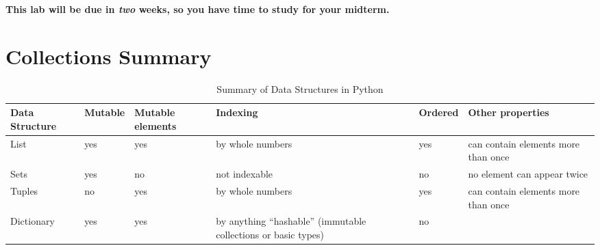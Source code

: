 \documentclass[11pt]{cselabheader}
\begin{document}
\textbf{This lab will be due in \emph{two} weeks, so you have time to study for your
midterm.}

%
%
%
%

\pagebreak
\section{Collections Summary}

\begin{table}[!ht]
  \centering
  \begin{tabular}{p{1.6cm}lp{1.6cm}p{3.5cm}lp{4.5cm}}
    \toprule
    Data Structure & Mutable & Mutable elements & Indexing & Ordered
    & Other
    properties\\
    \midrule
    List & yes & yes & by whole numbers & yes & can contain elements more than once\\
    Sets & yes & no & not indexable & no & no element can appear twice\\
    Tuples & no & yes & by whole numbers & yes & can contain elements more than
    once\\
    Dictionary & yes & yes & by anything ``hashable'' (immutable collections or
    basic types) & no & \\
    \bottomrule
  \end{tabular}
  \caption{Summary of Data Structures in Python}
  \label{tab:sum}
\end{table}
\end{document}
